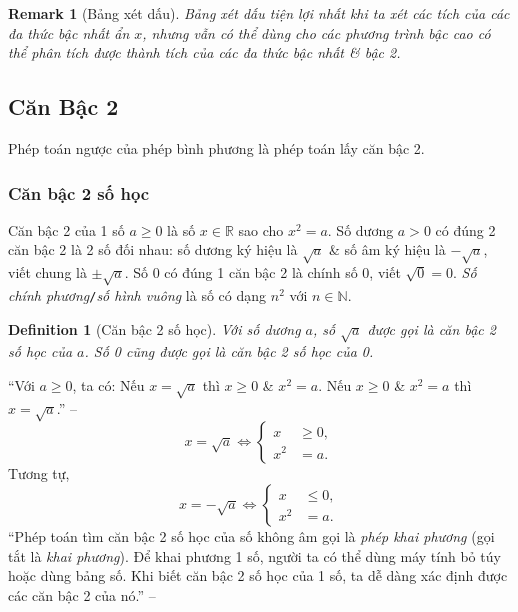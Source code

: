 \documentclass{article}
\numberwithin{equation}{section}
\newtheorem{definition}{Definition}[section]
\newtheorem{remark}{Remark}[section]
\begin{document}
\begin{remark}[Bảng xét dấu]
	Bảng xét dấu tiện lợi nhất khi ta xét các tích của các đa thức bậc nhất ẩn $x$, nhưng vẫn có thể dùng cho các phương trình bậc cao có thể phân tích được thành tích của các đa thức bậc nhất \& bậc 2.
\end{remark}

\subsection{Căn Bậc 2}
Phép toán ngược của phép bình phương là phép toán lấy căn bậc 2.

\subsubsection{Căn bậc 2 số học}
Căn bậc 2 của 1 số $a\ge 0$ là số $x\in\mathbb{R}$ sao cho $x^2 = a$. Số dương $a > 0$ có đúng 2 căn bậc 2 là 2 số đối nhau: số dương ký hiệu là $\sqrt{a}$ \& số âm ký hiệu là $-\sqrt{a}$, viết chung là $\pm\sqrt{a}$. Số 0 có đúng 1 căn bậc 2 là chính số 0, viết $\sqrt{0} = 0$. \textit{Số chính phương}\texttt{/}\textit{số hình vuông} là số có dạng $n^2$ với $n\in\mathbb{N}$.

\begin{definition}[Căn bậc 2 số học]
	Với số dương $a$, số $\sqrt{a}$ được gọi là \emph{căn bậc 2 số học} của $a$. Số 0 cũng được gọi là \emph{căn bậc 2 số học của 0}.
\end{definition}
``Với $a\ge 0$, ta có: Nếu $x = \sqrt{a}$ thì $x\ge 0$ \& $x^2 = a$. Nếu $x\ge 0$ \& $x^2 = a$ thì $x = \sqrt{a}$.'' -- \cite[p. 4]{SGK_Toan_9_tap_1}
\begin{equation*}
	x = \sqrt{a}\Leftrightarrow\left\{\begin{split}
		x&\ge 0,\\
		x^2 &= a.
	\end{split}\right.
\end{equation*}
Tương tự,
\begin{equation*}
	x = -\sqrt{a}\Leftrightarrow\left\{\begin{split}
		x&\le 0,\\
		x^2 &= a.
	\end{split}\right.
\end{equation*}
``Phép toán tìm căn bậc 2 số học của số không âm gọi là \textit{phép khai phương} (gọi tắt là \textit{khai phương}). Để khai phương 1 số, người ta có thể dùng máy tính bỏ túy hoặc dùng bảng số. Khi biết căn bậc 2 số học của 1 số, ta dễ dàng xác định được các căn bậc 2 của nó.'' -- \cite[p. 5]{SGK_Toan_9_tap_1}
\end{document}
